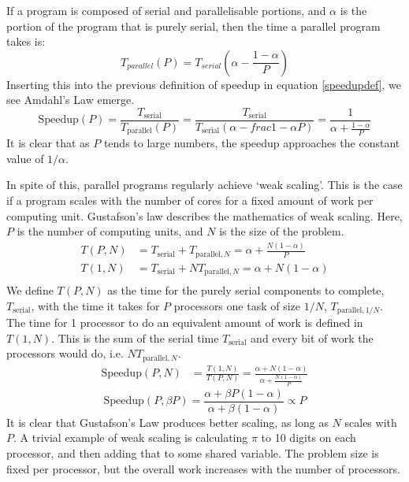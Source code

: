 \documentclass[../main.tex]{subfiles}
\begin{document}
    If a program is composed of serial and parallelisable portions, and $\alpha$ is the portion of the program that is purely serial, then the time a parallel program takes is:
    \begin{equation}
      T_{parallel}(P) = T_{serial}\left(\alpha-\frac{1-\alpha}{P}\right)
    \end{equation}
    Inserting this into the previous definition of speedup in equation \ref{speedupdef}, we see Amdahl's Law emerge.
    \begin{equation}
      \text{Speedup}(P) = \frac{T_\text{serial}}{T_\text{parallel}(P)} = \frac{T_\text{serial}}{T_\text{serial}\left(\alpha-frac{1-\alpha}{P}\right)} = \frac{1}{\alpha+\frac{1-\alpha}{P}}
      \label{amdahl}
    \end{equation}
    It is clear that as $P$ tends to large numbers, the speedup approaches the constant value of $1/\alpha$.  
    
    In spite of this, parallel programs regularly achieve `weak scaling'.
    This is the case if a program scales with the number of cores for a fixed amount of work per computing unit.
    Gustafson's law describes the mathematics of weak scaling.
    Here, $P$ is the number of computing units, and $N$ is the size of the problem.
    \begin{align*}
      T(P,N) &= T_\text{serial} + T_{\text{parallel},N} = \alpha + \frac{N(1-\alpha)}{P} \\
      T(1,N) &= T_\text{serial} + NT_{\text{parallel},N} = \alpha + N(1-\alpha) \\
    \end{align*}
    We define $T(P,N)$ as the time for the purely serial components to complete, $T_\text{serial}$, with the time it takes for $P$ processors one task of size $1/N$, $T_{\text{parallel},1/N}$.
    The time for 1 processor to do an equivalent amount of work is defined in $T(1,N)$.
    This is the sum of the serial time $T_\text{serial}$ and every bit of work the processors would do, i.e. $NT_{\text{parallel},N}$.
    \begin{align*}
      \text{Speedup}(P,N) &= \frac{T(1,N)}{T(P,N)} = \frac{\alpha+N(1-\alpha)}{\alpha+\frac{N(1-\alpha)}{P}} 
    \end{align*}
    \begin{equation}
      \text{Speedup}(P,\beta P) = \frac{\alpha+\beta P(1-\alpha)}{\alpha+\beta(1-\alpha)} \propto P
      \label{gustafson}
    \end{equation}
    It is clear that Gustafson's Law produces better scaling, as long as $N$ scales with $P$.
    A trivial example of weak scaling is calculating $\pi$ to 10 digits on each processor, and then adding that to some shared variable.
    The problem size is fixed per processor, but the overall work increases with the number of processors.
\end{document}

